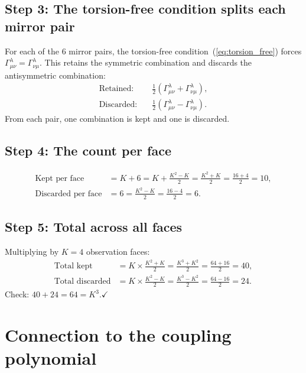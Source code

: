 \documentclass[11pt]{article}
\begin{document}
\subsection*{Step 3: The torsion-free condition splits each
mirror pair}

For each of the 6 mirror pairs, the torsion-free
condition~(\ref{eq:torsion_free}) forces
$\Gamma^\lambda_{\mu\nu} = \Gamma^\lambda_{\nu\mu}$.  This
retains the symmetric combination and discards the
antisymmetric combination:
\begin{align}
  \text{Retained:} \quad
    & \tfrac{1}{2}(\Gamma^\lambda_{\mu\nu}
    + \Gamma^\lambda_{\nu\mu}),
    \label{eq:sym} \\[4pt]
  \text{Discarded:} \quad
    & \tfrac{1}{2}(\Gamma^\lambda_{\mu\nu}
    - \Gamma^\lambda_{\nu\mu}).
    \label{eq:antisym}
\end{align}
From each pair, one combination is kept and one is discarded.

\subsection*{Step 4: The count per face}

\begin{align}
  \text{Kept per face} &= K + 6
    = K + \frac{K^2 - K}{2}
    = \frac{K^2 + K}{2}
    = \frac{16 + 4}{2} = 10,
    \label{eq:kept} \\[6pt]
  \text{Discarded per face} &= 6
    = \frac{K^2 - K}{2}
    = \frac{16 - 4}{2} = 6.
    \label{eq:disc}
\end{align}

\subsection*{Step 5: Total across all faces}

Multiplying by $K = 4$ observation faces:
\begin{align}
  \text{Total kept} &= K \times \frac{K^2 + K}{2}
    = \frac{K^3 + K^2}{2}
    = \frac{64 + 16}{2} = 40,
    \label{eq:total_kept} \\[6pt]
  \text{Total discarded} &= K \times \frac{K^2 - K}{2}
    = \frac{K^3 - K^2}{2}
    = \frac{64 - 16}{2} = 24.
    \label{eq:total_disc}
\end{align}
Check: $40 + 24 = 64 = K^3$.\quad$\checkmark$

\section{Connection to the coupling polynomial}
\end{document}
